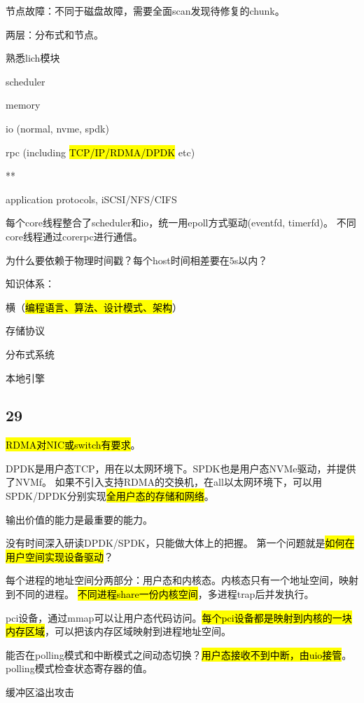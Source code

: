 节点故障：不同于磁盘故障，需要全面scan发现待修复的chunk。

两层：分布式和节点。

熟悉lich模块
\begin{enumbox}
\item scheduler
\item memory
\item io (normal, nvme, spdk)
\item rpc (including \hl{TCP/IP/RDMA/DPDK} etc)
\item ***
\item application protocols, iSCSI/NFS/CIFS
\end{enumbox}

每个core线程整合了scheduler和io，统一用epoll方式驱动(eventfd, timerfd)。
不同core线程通过corerpc进行通信。

为什么要依赖于物理时间戳？每个host时间相差要在5s以内？

知识体系：
\begin{enumbox}
\item 横（\hl{编程语言、算法、设计模式、架构}）
\item 存储协议
\item 分布式系统
\item 本地引擎
\end{enumbox}

\subsection{29}

\hl{RDMA对NIC或switch有要求}。

DPDK是用户态TCP，用在以太网环境下。SPDK也是用户态NVMe驱动，并提供了NVMf。
如果不引入支持RDMA的交换机，在all以太网环境下，可以用SPDK/DPDK分别实现\hl{全用户态的存储和网络}。

输出价值的能力是最重要的能力。

没有时间深入研读DPDK/SPDK，只能做大体上的把握。
第一个问题就是\hl{如何在用户空间实现设备驱动}？

每个进程的地址空间分两部分：用户态和内核态。内核态只有一个地址空间，映射到不同的进程。
\hl{不同进程share一份内核空间}，多进程trap后并发执行。

pci设备，通过mmap可以让用户态代码访问。\hl{每个pci设备都是映射到内核的一块内存区域}，可以把该内存区域映射到进程地址空间。

能否在polling模式和中断模式之间动态切换？\hl{用户态接收不到中断，由uio接管}。polling模式检查状态寄存器的值。

缓冲区溢出攻击

